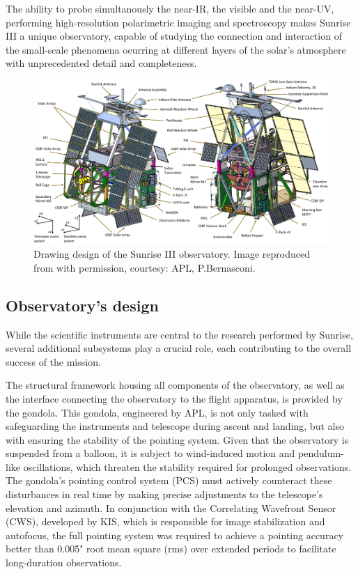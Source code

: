 The ability to probe simultanously the near-IR, the visible and the near-UV, performing high-resolution polarimetric imaging and spectroscopy makes Sunrise III a unique observatory, capable of studying the connection  and interaction of the small-scale phenomena ocurring at different layers of the solar's atmosphere with unprecedented detail and completeness. 

\begin{figure}[t]
    \includegraphics[width=\textwidth]{figures/TuMag/Sunrise_schematic.png}
    \caption[Sunrise III observatory design.]{
      Drawing design of the Sunrise III observatory. Image reproduced from \citep{SunriseIII} with permission, courtesy: APL, P.Bernasconi.}
      \label{fig: SunriseIII}
\end{figure}

\subsection{Observatory's design}

While the scientific instruments are central to the research performed by Sunrise, several additional subsystems play a crucial role, each contributing to the overall success of the mission.

The structural framework housing all components of the observatory, as well as the interface connecting the observatory to the flight apparatus, is provided by the gondola. This gondola, engineered by APL, is not only tasked with safeguarding the instruments and telescope during ascent and landing, but also with ensuring the stability of the pointing system. Given that the observatory is suspended from a balloon, it is subject to wind-induced motion and pendulum-like oscillations, which threaten the stability required for prolonged observations. The gondola’s pointing control system (PCS) must actively counteract these disturbances in real time by making precise adjustments to the telescope’s elevation and azimuth. In conjunction with the Correlating Wavefront Sensor (CWS), developed by KIS, which is responsible for image stabilization and autofocus, the full pointing system was required to achieve a pointing accuracy better than 0.005" root mean square (rms) over extended periods to facilitate long-duration observations.

